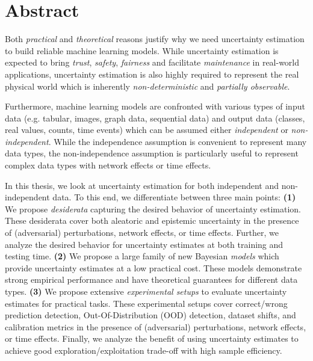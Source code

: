 \chapter*{Abstract}
%

Both \emph{practical} and \emph{theoretical} reasons justify why we need uncertainty estimation to build reliable machine learning models. While uncertainty estimation is expected to bring \emph{trust}, \emph{safety}, \emph{fairness} and facilitate \emph{maintenance} in real-world applications, uncertainty estimation is also highly required to represent the real physical world which is inherently \emph{non-deterministic} and \emph{partially observable}. 

Furthermore, machine learning models are confronted with various types of input data (e.g. tabular, images, graph data, sequential data) and output data (classes, real values, counts, time events) which can be assumed either \emph{independent} or \emph{non-independent}. While the independence assumption is convenient to represent many data types, the non-independence assumption is particularly useful to represent complex data types with network effects or time effects.

In this thesis, we look at uncertainty estimation for both independent and non-independent data. To this end, we differentiate between three main points: \textbf{(1)} We propose \emph{desiderata} capturing the desired behavior of uncertainty estimation. These desiderata cover both aleatoric and epistemic uncertainty in the presence of (adversarial) perturbations, network effects, or time effects. Further, we analyze  the desired behavior for uncertainty estimates at both training and testing time. \textbf{(2)} We propose a large family of new Bayesian \emph{models} which provide uncertainty estimates at a low practical cost. These models demonstrate strong empirical performance and have theoretical guarantees for different data types. \textbf{(3)} We propose extensive \emph{experimental setups} to evaluate uncertainty estimates for practical tasks. These experimental setups cover correct/wrong prediction detection, Out-Of-Distribution (OOD) detection, dataset shifts, and calibration metrics in the presence of (adversarial) perturbations, network effects, or time effects. Finally, we analyze the benefit of using uncertainty estimates to achieve good exploration/exploitation trade-off with high sample efficiency.
\\
